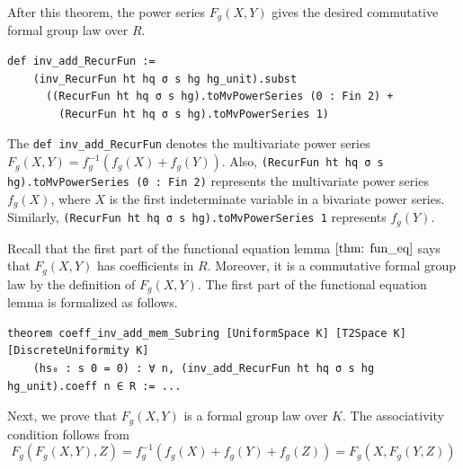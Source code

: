 After this theorem, the power series $F_g(X,Y)$ gives the desired
commutative formal group law over $R$.


\begin{lstlisting}
def inv_add_RecurFun :=
    (inv_RecurFun ht hq σ s hg hg_unit).subst
      ((RecurFun ht hq σ s hg).toMvPowerSeries (0 : Fin 2) +
        (RecurFun ht hq σ s hg).toMvPowerSeries 1)
\end{lstlisting}

The \lstinline|def inv_add_RecurFun| denotes the multivariate power series
$F_g(X,Y) = f_g^{-1}(f_g(X) + f_g(Y))$. Also,
\lstinline|(RecurFun ht hq σ s hg).toMvPowerSeries (0 : Fin 2)| represents the multivariate
power series $f_g(X)$, where $X$ is the first indeterminate variable in a bivariate power
series. Similarly, \lstinline|(RecurFun ht hq σ s hg).toMvPowerSeries 1| represents $f_g(Y)$.

Recall that the first part of the functional equation lemma $\ref{thm: fun_eq}$ says that
$F_g(X,Y)$ has coefficients in $R$. Moreover, it is a commutative formal group law by
the definition of $F_g(X,Y)$. The first part of the functional equation lemma is formalized as follows.

\begin{lstlisting}
theorem coeff_inv_add_mem_Subring [UniformSpace K] [T2Space K] [DiscreteUniformity K]
    (hs₀ : s 0 = 0) : ∀ n, (inv_add_RecurFun ht hq σ s hg hg_unit).coeff n ∈ R := ...
\end{lstlisting}

Next, we prove that $F_g(X,Y)$ is a formal group law over $K$. The associativity condition
follows from
\[F_g(F_g(X,Y), Z) = f_g^{-1} (f_g(X) + f_g(Y) + f_g(Z))=  F_g(X, F_g(Y,Z))\]




